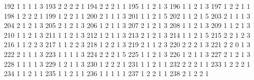 \documentclass[
  letterpaper,
  DIV=11,
  numbers=noendperiod]{scrreprt}
\newenvironment{Shaded}{\begin{snugshade}}{\end{snugshade}}
\newcommand{\NormalTok}[1]{\textcolor[rgb]{0.00,0.23,0.31}{#1}}
\begin{document}
\begin{Shaded}
\begin{Highlighting}[]
\NormalTok{192         1         1     1    1        3}
\NormalTok{193         2         2     2    2        1}
\NormalTok{194         2         2     2    1        1}
\NormalTok{195         1         1     2    1        3}
\NormalTok{196         1         1     2    1        3}
\NormalTok{197         1         2     2    1        1}
\NormalTok{198         1         2     2    2        1}
\NormalTok{199         1         2     2    1        1}
\NormalTok{200         2         1     1    1        3}
\NormalTok{201         1         1     2    1        5}
\NormalTok{202         1         1     2    1        5}
\NormalTok{203         2         1     1    1        3}
\NormalTok{204         2         1     2    1        3}
\NormalTok{205         2         1     2    1        3}
\NormalTok{206         1         2     1    1        3}
\NormalTok{207         2         1     2    1        3}
\NormalTok{208         1         1     2    1        3}
\NormalTok{209         1         1     2    1        3}
\NormalTok{210         1         1     2    1        3}
\NormalTok{211         1         1     2    1        3}
\NormalTok{212         1         2     1    1        3}
\NormalTok{213         2         1     2    1        3}
\NormalTok{214         1         1     2    1        5}
\NormalTok{215         2         2     1    2        3}
\NormalTok{216         1         1     2    2        3}
\NormalTok{217         1         1     2    2        3}
\NormalTok{218         1         2     2    1        3}
\NormalTok{219         2         1     1    2        3}
\NormalTok{220         2         2     2    1        3}
\NormalTok{221         2         2     0    1        3}
\NormalTok{222         2         1     1    1        3}
\NormalTok{223         1         1     1    1        3}
\NormalTok{224         2         2     2    1        5}
\NormalTok{225         1         1     2    1        3}
\NormalTok{226         1         2     1    1        3}
\NormalTok{227         2         1     2    1        3}
\NormalTok{228         1         1     1    1        3}
\NormalTok{229         1         2     1    1        3}
\NormalTok{230         1         2     2    2        1}
\NormalTok{231         1         1     2    1        1}
\NormalTok{232         2         2     2    1        1}
\NormalTok{233         1         2     2    2        1}
\NormalTok{234         1         1     2    1        1}
\NormalTok{235         1         1     2    1        1}
\NormalTok{236         1         1     1    1        1}
\NormalTok{237         1         2     2    1        1}
\NormalTok{238         2         1     2    2        1}

\end{Highlighting}
\end{Shaded}
\end{document}
